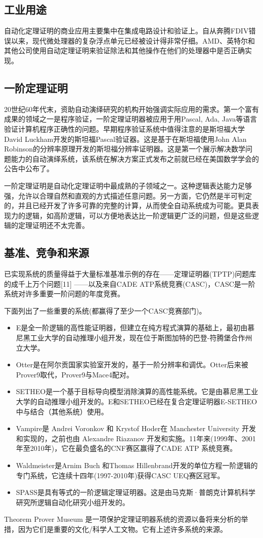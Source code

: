 \subsection{工业用途}
自动化定理证明的商业应用主要集中在集成电路设计和验证上。自从奔腾FDIV错误以来，现代微处理器的复杂浮点单元已经被设计得非常仔细。AMD、英特尔和其他公司使用自动定理证明来验证除法和其他操作在他们的处理器中是否正确实现。

\subsection{一阶定理证明}
20世纪60年代末，资助自动演绎研究的机构开始强调实际应用的需求。第一个富有成果的领域之一是程序验证，一阶定理证明器被应用于用Pascal, Ada, Java等语言验证计算机程序正确性的问题。早期程序验证系统中值得注意的是斯坦福大学David Luckham开发的斯坦福Pascal验证器。这是基于在斯坦福使用John Alan Robinson的分辨率原理开发的斯坦福分辨率证明器。这是第一个展示解决数学问题能力的自动演绎系统，该系统在解决方案正式发布之前就已经在美国数学学会的公告中公布了。

一阶定理证明是自动化定理证明中最成熟的子领域之一。这种逻辑表达能力足够强，允许以合理自然和直观的方式描述任意问题。另一方面，它仍然是半可判定的，并且已经开发了许多可靠的完整的计算，从而使全自动系统成为可能。更具表现力的逻辑，如高阶逻辑，可以方便地表达比一阶逻辑更广泛的问题，但是这些逻辑的定理证明还不太完善。

\subsection{ 基准、竞争和来源}
已实现系统的质量得益于大量标准基准示例的存在——定理证明器(TPTP)问题库的成千上万个问题[11] ——以及来自CADE ATP系统竞赛(CASC)，CASC是一阶系统对许多重要一阶问题的年度竞赛。

下面列出了一些重要的系统(都赢得了至少一个CASC竞赛部门)。
\begin{itemize}
\item E是全一阶逻辑的高性能证明器，但建立在纯方程式演算的基础上，最初由慕尼黑工业大学的自动推理小组开发，现在位于斯图加特的巴登-符腾堡合作州立大学。
\item Otter是在阿尔贡国家实验室开发的，基于一阶分辨率和调优。Otter后来被Prover9取代，Prover9与Mace4配对。
\item SETHEO是一个基于目标导向模型消除演算的高性能系统。它是由慕尼黑工业大学的自动推理小组开发的。E和SETHEO已经在复合定理证明器E-SETHEO中与结合（其他系统）使用。
\item Vampire是 Andrei Voronkov 和 Krystof Hoder在 Manchester University 开发和实现的，之前也由 Alexandre Riazanov 开发和实施。11年来(1999年、2001年至2010年)，它在最负盛名的CNF赛区赢得了CADE ATP 系统竞赛。
\item Waldmeister是Arnim Buch 和Thomas Hillenbrand开发的单位方程一阶逻辑的专门系统，它连续十四年(1997-2010年)获得CASC UEQ赛区冠军。
\item SPASS是具有等式的一阶逻辑定理证明器。这是由马克斯·普朗克计算机科学研究所逻辑自动化研究小组开发的。
\end{itemize}
Theorem Prover Museum 是一项保护定理证明器系统的资源以备将来分析的举措，因为它们是重要的文化/科学人工文物。它有上述许多系统的来源。

